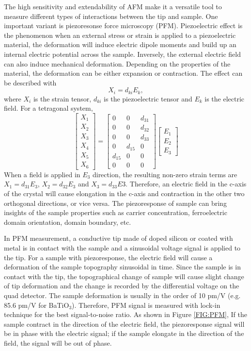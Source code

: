 \documentclass[pdftex, sectionletters]{pittetd}    %
\begin{document}
The high sensitivity and extendability of AFM make it a versatile tool to measure different types of interactions between the tip and sample. One important variant is piezoresonse force microscopy (PFM). Piezoelectric effect is the phenomenon when an external stress or strain is applied to a piezoelectric material, the deformation will induce electric dipole moments and build up an internal electric potential across the sample. Inversely, the external electric field can also induce mechanical deformation. Depending on the properties of the material, the deformation can be either expansion or contraction. The effect can be described with
$$
X_i = d_{ki}E_k,
$$
where $X_i$ is the strain tensor, $d_{ki}$ is the piezoelectric tensor and $E_k$ is the electric field. For a tetragonal system, 
$$
\begin{bmatrix}
	X_{1} \\
	X_{2} \\
	X_{3} \\
	X_{4} \\
	X_{5} \\
	X_{6}
\end{bmatrix} =
\begin{bmatrix}
	0 & 0 & d_{31} \\
	0 & 0 & d_{32} \\
	0 & 0 & d_{33} \\
	0 & d_{15} & 0 \\
	d_{15} & 0 & 0 \\
	0 & 0 & 0
\end{bmatrix}
\begin{bmatrix}
	E_{1} \\
	E_{2} \\
	E_{3}
\end{bmatrix}
$$
When a field is applied in $E_3$ direction, the resulting non-zero strain terms are $X_1 = d_{31}E_3$, $X_2 = d_{32}E_3$ and $X_3 = d_{33}E3$. Therefore, an electric field in the c-axis of the crystal will cause elongation in the c-axis and contraction in the other two orthogonal directions, or vice versa. The piezoresponse of sample can bring insights of the sample properties such as carrier concentration\cite{}, ferroelectric domain orientation\cite{}, domain boundary\cite{}, etc.

In PFM measurement, a conductive tip made of doped silicon or coated with metal is in contact with the sample and a sinusoidal voltage signal is applied to the tip. For a sample with piezoresponse, the electric field will cause a deformation of the sample topography sinusoidal in time. Since the sample is in contact with the tip, the topographical change of sample will cause slight change of tip deformation and the change is recorded by the differential voltage on the quad detector. The sample deformation is usually in the order of 10 pm/V (e.g. 85.6 pm/V for BaTiO$_3$\cite{}). Therefore, PFM signal is measured with lock-in technique for the best signal-to-noise ratio. As shown in Figure \ref{FIG:PFM}, If the sample contract in the direction of the electric field, the piezoresponse signal will be in phase with the electric signal; if the sample elongate in the direction of the field, the signal will be out of phase.
\end{document}
